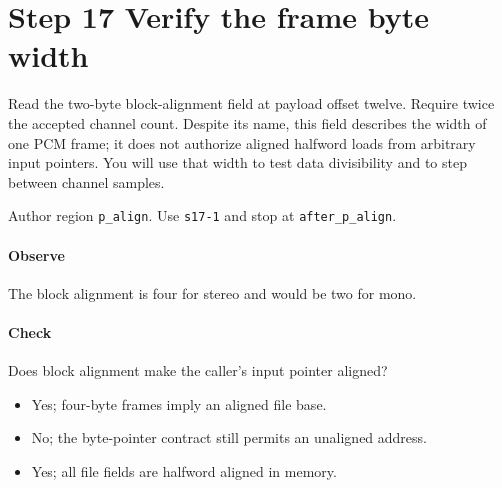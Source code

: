 \section{Step 17 Verify the frame byte width}\label{pcm-wav-s17}
Read the two-byte block-alignment field at payload offset twelve. Require twice the accepted channel count. Despite its name, this field describes the width of one PCM frame; it does not authorize aligned halfword loads from arbitrary input pointers. You will use that width to test data divisibility and to step between channel samples.

Author region \texttt{p\_align}. Use \texttt{s17-1} and stop at \texttt{after\_p\_align}.

\paragraph{Observe} The block alignment is four for stereo and would be two for mono.

\paragraph{Check} Does block alignment make the caller's input pointer aligned?
\begin{itemize}
\item[A.] Yes; four-byte frames imply an aligned file base.
\item[B.] No; the byte-pointer contract still permits an unaligned address.
\item[C.] Yes; all file fields are halfword aligned in memory.
\end{itemize}
